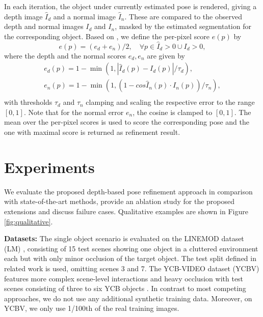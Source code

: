 \documentclass[10pt,twocolumn,letterpaper]{article}
\begin{document}
In each iteration, the object under currently estimated pose is rendered, giving a depth image $\hat{I}_d$ and a normal image $\hat{I}_n$. These are compared to the observed depth and normal images $I_d$ and $I_n$, masked by the estimated segmentation for the corresponding object. Based on \cite{bauer2020verefine}, we define the per-pixel score $e(p)$ by
\begin{equation}
    e(p) = (e_d + e_n)/2, \quad \forall p \in \hat{I}_d > 0 \cup I_d > 0,
\end{equation}
where the depth and the normal scores $e_d,e_n$ are given by
\begin{equation}
    \begin{split}
        e_d(p) = 1 - \min(1, |\hat{I}_d(p) - I_d(p)| / \tau_d), \\
        e_n(p) = 1 - \min(1, (1 - cos \hat{I}_n(p) \cdot I_n(p)) / \tau_n), \\
    \end{split}
\end{equation}
with thresholds $\tau_d$ and $\tau_n$ clamping and scaling the respective error to the range $[0, 1]$. Note that for the normal error $e_n$, the cosine is clamped to $[0, 1]$. The mean over the per-pixel scores is used to score the corresponding pose and the one with maximal score is returned as refinement result.

\section{Experiments}\label{sec:experiments}
We evaluate the proposed depth-based pose refinement approach in comparison with state-of-the-art methods, provide an ablation study for the proposed extensions and discuss failure cases. Qualitative examples are shown in Figure \ref{fig:qualitative}.

\textbf{Datasets:} The single object scenario is evaluated on the LINEMOD dataset (LM) \cite{hinterstoisser2012adi}, consisting of 15 test scenes showing one object in a cluttered environment each but with only minor occlusion of the target object. The test split defined in related work \cite{brachmann2016uncertainty,rad2017bb8,tekin2018real} is used, omitting scenes 3 and 7. The YCB-VIDEO dataset (YCBV) \cite{xiang2017posecnn} features more complex scene-level interactions and heavy occlusion with test scenes consisting of three to six YCB objects \cite{calli2015ycb}. In contrast to most competing approaches, we do not use any additional synthetic training data. Moreover, on YCBV, we only use 1/100th of the real training images.
\end{document}
